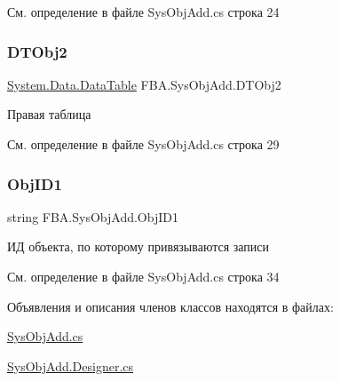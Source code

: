 См. определение в файле Sys\+Obj\+Add.\+cs строка 24

\mbox{\label{class_f_b_a_1_1_sys_obj_add_a916e9b266ea88aa2a42d98419f037ea4}} 
\subsubsection{\texorpdfstring{D\+T\+Obj2}{DTObj2}}
{\footnotesize\ttfamily \mbox{\hyperlink{_sys_static_8cs_a6542cfcff2f8e81f06ade15aa0bfe2b7}{System.\+Data.\+Data\+Table}} F\+B\+A.\+Sys\+Obj\+Add.\+D\+T\+Obj2}



Правая таблица 



См. определение в файле Sys\+Obj\+Add.\+cs строка 29

\mbox{\label{class_f_b_a_1_1_sys_obj_add_ad0aead348bebf3f139d9fca7ba6b443e}} 
\subsubsection{\texorpdfstring{Obj\+I\+D1}{ObjID1}}
{\footnotesize\ttfamily string F\+B\+A.\+Sys\+Obj\+Add.\+Obj\+I\+D1}



ИД объекта, по которому привязываются записи 



См. определение в файле Sys\+Obj\+Add.\+cs строка 34



Объявления и описания членов классов находятся в файлах\+:\begin{DoxyCompactItemize}
\item 
\mbox{\hyperlink{_sys_obj_add_8cs}{Sys\+Obj\+Add.\+cs}}\item 
\mbox{\hyperlink{_sys_obj_add_8_designer_8cs}{Sys\+Obj\+Add.\+Designer.\+cs}}\end{DoxyCompactItemize}
